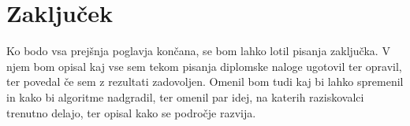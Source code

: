 \chapter{Zaključek}\label{1407-1013}

Ko bodo vsa prejšnja poglavja končana, se bom lahko lotil pisanja zaključka. V njem bom opisal kaj vse sem tekom pisanja diplomske naloge ugotovil ter opravil, ter povedal če sem z rezultati zadovoljen. Omenil bom tudi kaj bi lahko spremenil in kako bi algoritme nadgradil, ter omenil par idej, na katerih raziskovalci trenutno delajo, ter opisal kako se področje razvija. 